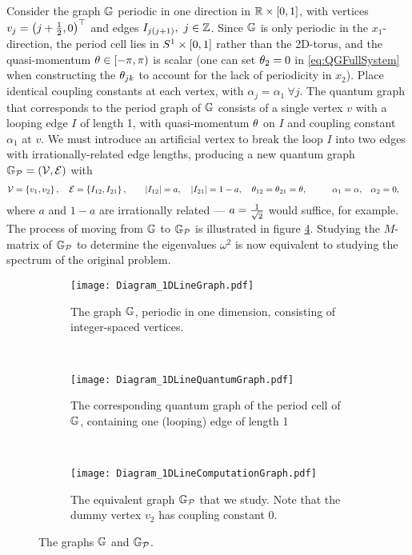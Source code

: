 Consider the graph $\mathbb{G}$ periodic in one direction in $\mathbb{R}\times\left[ 0,1 \right]$, with vertices $v_j = \left( j + \frac{1}{2}, 0 \right)^\top$ and edges $I_{j\bracs{j+1}}, \ j\in\integers$.
Since $\mathbb{G}$ is only periodic in the $x_1$-direction, the period cell lies in $S^1\times\left[ 0,1 \right]$ rather than the 2D-torus, and the quasi-momentum $\theta\in\left[-\pi,\pi\right)$ is scalar (one can set $\theta_2=0$ in \eqref{eq:QGFullSystem} when constructing the $\theta_{jk}$ to account for the lack of periodicity in $x_2$).
Place identical coupling constants at each vertex, with $\alpha_j = \alpha_1 \ \forall j$.
The quantum graph that corresponds to the period graph of $\mathbb{G}$ consists of a single vertex $v$ with a looping edge $I$ of length 1, with quasi-momentum $\theta$ on $I$ and coupling constant $\alpha_1$ at $v$.
We must introduce an artificial vertex to break the loop $I$ into two edges with irrationally-related edge lengths, producing a new quantum graph $\mathbb{G}_{\mathcal{P}}=\left( \mathcal{V}, \mathcal{E} \right)$ with
\begin{align*}
	\mathcal{V} = \left\{  v_1 , v_2  \right\}, \quad \mathcal{E} = \left\{  I_{12}, I_{21}  \right\},
	&\qquad \left\lvert I_{12} \right\rvert = a, \quad \left\lvert I_{21} \right\rvert = 1-a, \quad \theta_{12} = \theta_{21} = \theta, 
	&\qquad \alpha_1 = \alpha, \quad &\alpha_2 = 0,
\end{align*}
where $a$ and $1-a$ are irrationally related --- $a = \frac{1}{\sqrt{2}}$ would suffice, for example.
The process of moving from $\mathbb{G}$ to $\mathbb{G}_{\mathcal{P}}$ is illustrated in figure \ref{fig:Diagram_1DExample}.
Studying the $M$-matrix of $\mathbb{G}_{\mathcal{P}}$ to determine the eigenvalues $\omega^2$ is now equivalent to studying the spectrum of the original problem.
\begin{figure}[h!]
	\centering
	\begin{subfigure}[t]{0.3\textwidth}
		\centering
		\texttt{[image: Diagram\_1DLineGraph.pdf]}
		\caption{\label{fig:Diagram_1DLineGraph} The graph $\mathbb{G}$, periodic in one dimension, consisting of integer-spaced vertices.}
	\end{subfigure}
	~
	\begin{subfigure}[t]{0.3\textwidth}
		\centering
		\texttt{[image: Diagram\_1DLineQuantumGraph.pdf]}
		\caption{\label{fig:Diagram_1DLineQuantumGraph} The corresponding quantum graph of the period cell of $\mathbb{G}$, containing one (looping) edge of length 1}
	\end{subfigure}
	~
	\begin{subfigure}[t]{0.3\textwidth}
		\centering
		\texttt{[image: Diagram\_1DLineComputationGraph.pdf]}	
		\caption{\label{fig:Diagram_1DLineComputationGraph} The equivalent graph $\mathbb{G}_{\mathcal{P}}$ that we study. Note that the dummy vertex $v_2$ has coupling constant 0.}
	\end{subfigure}
	\caption{\label{fig:Diagram_1DExample} The graphs $\mathbb{G}$ and $\mathbb{G}_{\mathcal{P}}$.}
\end{figure} \newline

